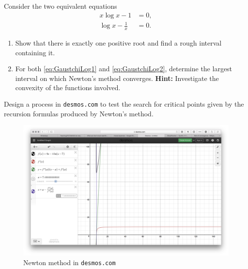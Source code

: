 \begin{problem}[Basic]
Consider the two equivalent equations
\begin{align}
x\log x -1 &= 0, \label{eq:GaustchiLog1} \\
\log x - \frac{1}{x} &= 0. \label{eq:GaustchiLog2}
\end{align}
\begin{enumerate}
	\item Show that there is exactly one positive root and find a rough interval containing it.
	\item For both \eqref{eq:GaustchiLog1} and \eqref{eq:GaustchiLog2}, determine the largest interval on which Newton's method converges. \newline \textbf{Hint: } Investigate the convexity of the functions involved.
\end{enumerate}
\end{problem}

\begin{problem}[CAS]
Design a process in \texttt{desmos.com} to test the search for critical points given by the recursion formulas produced by Newton's method.
\begin{figure}[ht!]
\includegraphics[width=\linewidth]{desmos.png}
\caption{Newton method in \texttt{desmos.com}}
\label{figure:desmosNewton}
\end{figure}
\end{problem}

